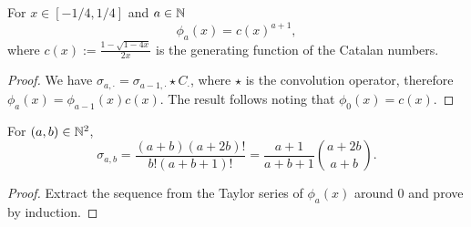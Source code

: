 \begin{myprop*}
For $x\in [-1/4,1/4]$ and $a\in \mathbb{N}$ 
$$\phi_a(x)=c(x)^{a+1},$$
where $c(x):=\frac{1-\sqrt{1-4x}}{2x}$ is the generating function of the Catalan numbers.
\end{myprop*}
\begin{proof}
We have $\sigma_{a,\cdot}=\sigma_{a-1,\cdot}\star C_\cdot$, where $\star$ is the convolution operator, therefore $\phi_a(x)=\phi_{a-1}(x)c(x)$. The result follows noting that $\phi_0(x)=c(x)$.
\end{proof}

\begin{myprop*}
For $(a,b)\in\mathbb{N}^2$,
$$\sigma_{a,b}=\frac{(a+b)(a+2b)!}{b!(a+b+1)!}=\frac{a+1}{a+b+1}{a+2b\choose a+b}.$$
\end{myprop*}
\begin{proof}
Extract the sequence from the Taylor series of $\phi_a(x)$ around 0 and prove by induction.
\end{proof}





